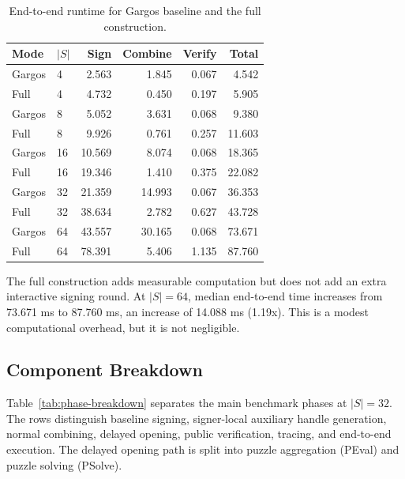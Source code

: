 \begin{table}[t]
\centering
\caption{End-to-end runtime for Gargos baseline and the full construction.}
\label{tab:e2e-performance}
\small
\begin{tabular}{llrrrr}
\toprule
Mode & $|S|$ & Sign & Combine & Verify & Total \\
\midrule
Gargos & 4 & 2.563 & 1.845 & 0.067 & 4.542 \\
Full & 4 & 4.732 & 0.450 & 0.197 & 5.905 \\
Gargos & 8 & 5.052 & 3.631 & 0.068 & 9.380 \\
Full & 8 & 9.926 & 0.761 & 0.257 & 11.603 \\
Gargos & 16 & 10.569 & 8.074 & 0.068 & 18.365 \\
Full & 16 & 19.346 & 1.410 & 0.375 & 22.082 \\
Gargos & 32 & 21.359 & 14.993 & 0.067 & 36.353 \\
Full & 32 & 38.634 & 2.782 & 0.627 & 43.728 \\
Gargos & 64 & 43.557 & 30.165 & 0.068 & 73.671 \\
Full & 64 & 78.391 & 5.406 & 1.135 & 87.760 \\
\bottomrule
\end{tabular}
\end{table}

The full construction adds measurable computation but does not add an extra
interactive signing round.  At $|S|=64$, median end-to-end time increases from
73.671 ms to 87.760 ms, an increase of 14.088 ms (1.19x). This is a modest computational overhead, but it is not negligible.

\subsection{Component Breakdown}

Table~\ref{tab:phase-breakdown} separates the main benchmark phases at
$|S|=32$.  The rows distinguish baseline signing, signer-local auxiliary handle
generation, normal combining, delayed opening, public verification, tracing, and
end-to-end execution.  The delayed opening path is split into puzzle aggregation
(\textsf{PEval}) and puzzle solving (\textsf{PSolve}).

